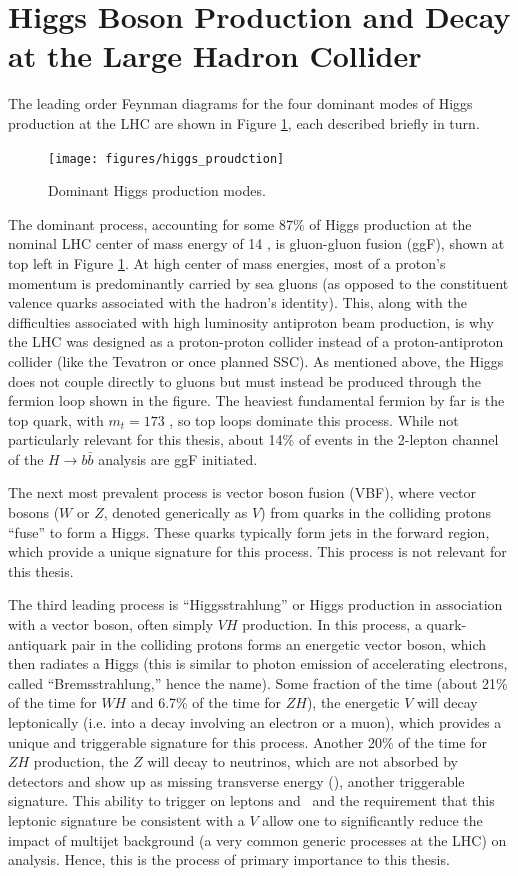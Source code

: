 \section{Higgs Boson Production and Decay at the Large Hadron Collider}
The leading order Feynman diagrams for the four dominant modes of Higgs production at the LHC are shown in Figure \ref{fig:hprod}, each described briefly in turn.
\begin{figure}[!htbp]\captionsetup{justification=centering}
  \centering
  \texttt{[image: figures/higgs\_proudction]}
  \caption{Dominant Higgs production modes.}
  \label{fig:hprod}
\end{figure}
The dominant process, accounting for some 87\% of Higgs production at the nominal LHC center of mass energy of 14 \tev, is gluon-gluon fusion (ggF), shown at top left in Figure \ref{fig:hprod}.  At high center of mass energies, most of a proton's momentum is predominantly carried by sea gluons (as opposed to the constituent valence quarks associated with the hadron's identity).  This, along with the difficulties associated with high luminosity antiproton beam production, is why the LHC was designed as a proton-proton collider instead of a proton-antiproton collider (like the Tevatron or once planned SSC).  As mentioned above, the Higgs does not couple directly to gluons but must instead be produced through the fermion loop shown in the figure.  The heaviest fundamental fermion by far is the top quark, with $m_t=173$ \gev, so top loops dominate this process.  While not particularly relevant for this thesis, about 14\% of events in the 2-lepton channel of the $H\to b\bar{b}$ analysis are ggF initiated.

The next most prevalent process is vector boson fusion (VBF), where vector bosons ($W$ or $Z$, denoted generically as $V$) from quarks in the colliding protons ``fuse'' to form a Higgs.  These quarks typically form jets in the forward region, which provide a unique signature for this process.  This process is not relevant for this thesis.

The third leading process is ``Higgsstrahlung'' or Higgs production in association with a vector boson, often simply $VH$ production.  In this process, a quark-antiquark pair in the colliding protons forms an energetic vector boson, which then radiates a Higgs (this is similar to photon emission of accelerating electrons, called ``Bremsstrahlung,'' hence the name).  Some fraction of the time (about 21\% of the time for $WH$ and 6.7\% of the time for $ZH$), the energetic $V$ will decay leptonically (i.e. into a decay involving an electron or a muon), which provides a unique and triggerable signature for this process.  Another 20\% of the time for $ZH$ production, the $Z$ will decay to neutrinos, which are not absorbed by detectors and show up as missing transverse energy (\met), another triggerable signature.  This ability to trigger on leptons and \met\, and the requirement that this leptonic signature be consistent with a $V$ allow one to significantly reduce the impact of multijet background (a very common generic processes at the LHC) on analysis.  Hence, this is the process of primary importance to this thesis.

